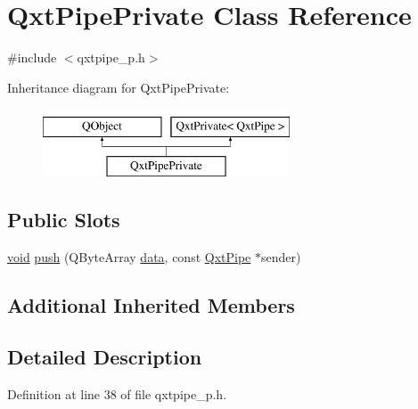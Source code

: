 \hypertarget{class_qxt_pipe_private}{\section{Qxt\-Pipe\-Private Class Reference}
\label{class_qxt_pipe_private}
}


{\ttfamily \#include $<$qxtpipe\-\_\-p.\-h$>$}

Inheritance diagram for Qxt\-Pipe\-Private\-:\begin{figure}[H]
\begin{center}
\leavevmode
\includegraphics[height=2.000000cm]{class_qxt_pipe_private}
\end{center}
\end{figure}
\subsection*{Public Slots}
\begin{DoxyCompactItemize}
\item 
\hyperlink{group___u_a_v_objects_plugin_ga444cf2ff3f0ecbe028adce838d373f5c}{void} \hyperlink{class_qxt_pipe_private_a14f4c257136fd2fac223157040a148a6}{push} (Q\-Byte\-Array \hyperlink{glext_8h_a8850df0785e6fbcc2351af3b686b8c7a}{data}, const \hyperlink{class_qxt_pipe}{Qxt\-Pipe} $\ast$sender)
\end{DoxyCompactItemize}
\subsection*{Additional Inherited Members}


\subsection{Detailed Description}


Definition at line 38 of file qxtpipe\-\_\-p.\-h.



